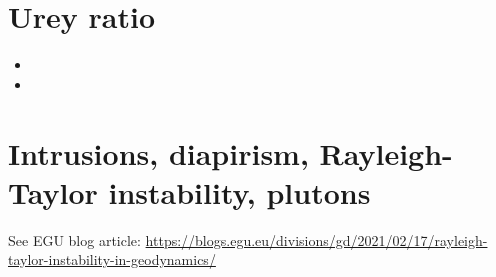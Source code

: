 \section{Urey ratio}

\begin{small}
\begin{itemize}
\item[\twothousandeight] 
\item[\twothousandtwelve] 
\end{itemize}
\end{small}

\section{Intrusions, diapirism, Rayleigh-Taylor instability, plutons}

See EGU blog article: 
\url{https://blogs.egu.eu/divisions/gd/2021/02/17/rayleigh-taylor-instability-in-geodynamics/}

